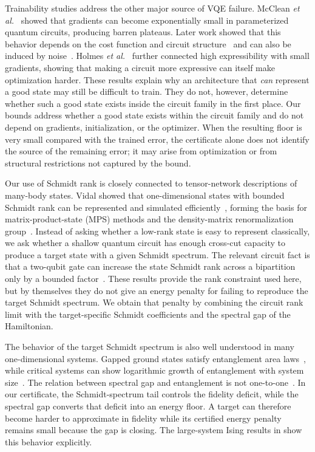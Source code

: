 \documentclass[reprint,aps,pra,floatfix,superscriptaddress,nofootinbib,longbibliography]{revtex4-2}
\theoremstyle{remark}
\theoremstyle{definition}
\begin{document}
Trainability studies address the other major source of VQE failure. McClean
\emph{et al.}~\cite{mcclean2018barren} showed that gradients can become
exponentially small in parameterized quantum circuits, producing barren plateaus.
Later work showed that this behavior depends on the cost function and circuit
structure~\cite{cerezo2021cost} and can also be induced by
noise~\cite{wang2021noiseinduced}. Holmes \emph{et al.}~\cite{holmes2022connecting}
further connected high expressibility with small gradients, showing that making a
circuit more expressive can itself make optimization harder. These results
explain why an architecture that \emph{can} represent a good state may still be
difficult to train. They do not, however, determine whether such a good state
exists inside the circuit family in the first place. Our bounds address whether a good state exists within the circuit family and do
not depend on gradients, initialization, or the
optimizer. When the resulting floor is very small compared with the trained error, the
certificate alone does not identify the source of the remaining error; it may
arise from optimization or from structural restrictions not captured by the
bound.

Our use of Schmidt rank is closely connected to tensor-network descriptions of
many-body states. Vidal showed that one-dimensional states with bounded Schmidt
rank can be represented and simulated efficiently~\cite{vidal2003efficient,vidal2004efficient},
forming the basis for matrix-product-state (MPS) methods and the density-matrix
renormalization group~\cite{schollwock2011density}. Instead of asking
whether a low-rank state is easy to represent classically, we ask whether a
shallow quantum circuit has enough cross-cut capacity to produce a target state
with a given Schmidt spectrum. The relevant circuit fact is that a two-qubit
gate can increase the state Schmidt rank across a bipartition only by a bounded
factor~\cite{nielsen2003quantum,vatan2004optimal,balakrishnan2010operator}. These results provide the rank constraint used here, but by
themselves they do not give an energy penalty for failing to reproduce the target
Schmidt spectrum. We obtain that penalty by combining the circuit rank limit with
the target-specific Schmidt coefficients and the spectral gap of the
Hamiltonian.

The behavior of the target Schmidt spectrum is also well understood in many
one-dimensional systems. Gapped ground states satisfy entanglement area
laws~\cite{eisert2010colloquium}, while critical systems can show logarithmic
growth of entanglement with system
size~\cite{calabrese2004entanglement,laflorencie2016quantum,sachdev2011quantum}.
The relation between spectral gap and entanglement is not
one-to-one~\cite{gottesman2010entanglement}. In our certificate, the Schmidt-spectrum tail controls the fidelity deficit,
while the spectral gap converts that deficit into an energy floor. A target can
therefore become harder to approximate in fidelity while its certified energy
penalty remains small because the gap is closing. The large-system Ising results
in  show this behavior explicitly.
\end{document}
